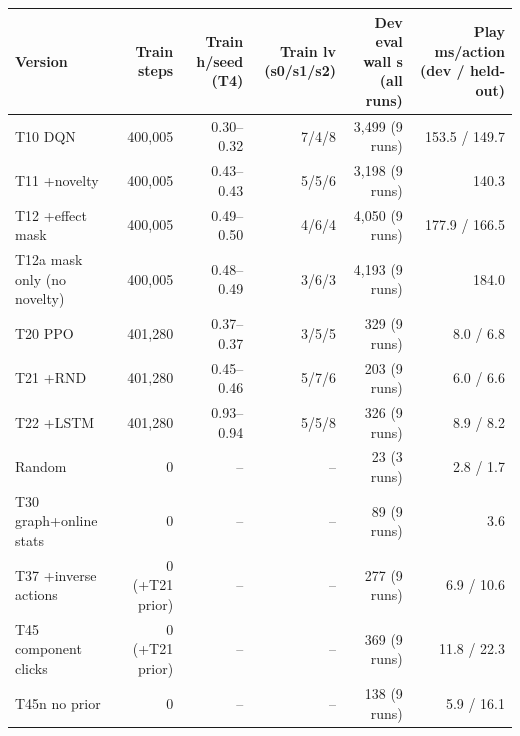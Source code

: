 \begin{tabular}{@{}lrrrrr@{}}
\toprule
Version & Train steps & Train h/seed (T4) & Train lv (s0/s1/s2) & Dev eval wall s (all runs) & Play ms/action (dev / held-out) \\
\midrule
T10 DQN & 400{,}005 & 0.30--0.32 & 7/4/8 & 3{,}499 (9 runs) & 153.5 / 149.7 \\
T11 +novelty & 400{,}005 & 0.43--0.43 & 5/5/6 & 3{,}198 (9 runs) & 140.3 \\
T12 +effect mask & 400{,}005 & 0.49--0.50 & 4/6/4 & 4{,}050 (9 runs) & 177.9 / 166.5 \\
T12a mask only (no novelty) & 400{,}005 & 0.48--0.49 & 3/6/3 & 4{,}193 (9 runs) & 184.0 \\
T20 PPO & 401{,}280 & 0.37--0.37 & 3/5/5 & 329 (9 runs) & 8.0 / 6.8 \\
T21 +RND & 401{,}280 & 0.45--0.46 & 5/7/6 & 203 (9 runs) & 6.0 / 6.6 \\
T22 +LSTM & 401{,}280 & 0.93--0.94 & 5/5/8 & 326 (9 runs) & 8.9 / 8.2 \\
Random & 0 & -- & -- & 23 (3 runs) & 2.8 / 1.7 \\
T30 graph+online stats & 0 & -- & -- & 89 (9 runs) & 3.6 \\
T37 +inverse actions & 0 (+T21 prior) & -- & -- & 277 (9 runs) & 6.9 / 10.6 \\
T45 component clicks & 0 (+T21 prior) & -- & -- & 369 (9 runs) & 11.8 / 22.3 \\
T45n no prior & 0 & -- & -- & 138 (9 runs) & 5.9 / 16.1 \\
\bottomrule
\end{tabular}
